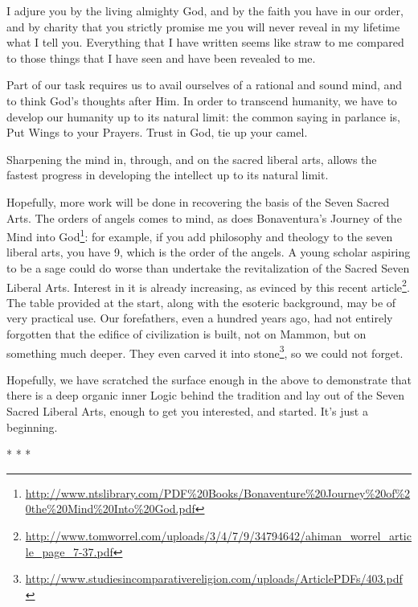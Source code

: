 \begin{quotex}
I adjure you by the living almighty God, and by the faith you have in our order, and by charity that you strictly promise me you will never reveal in my lifetime what I tell you. Everything that I have written seems like straw to me compared to those things that I have seen and have been revealed to me.
\end{quotex}


Part of our task requires us to avail ourselves of a rational and sound mind, and to think God's thoughts after Him. In order to transcend humanity, we have to develop our humanity up to its natural limit: the common saying in parlance is, Put Wings to your Prayers. Trust in God, tie up your camel.

Sharpening the mind in, through, and on the sacred liberal arts, allows the fastest progress in developing the intellect up to its natural limit.

Hopefully, more work will be done in recovering the basis of the Seven Sacred Arts. The orders of angels comes to mind, as does Bonaventura's Journey of the Mind into God\footnote{\url{http://www.ntslibrary.com/PDF\%20Books/Bonaventure\%20Journey\%20of\%20the\%20Mind\%20Into\%20God.pdf}}: for example, if you add philosophy and theology to the seven liberal arts, you have 9, which is the order of the angels. A young scholar aspiring to be a sage could do worse than undertake the revitalization of the Sacred Seven Liberal Arts. Interest in it is already increasing, as evinced by this recent article\footnote{\url{http://www.tomworrel.com/uploads/3/4/7/9/34794642/ahiman_worrel_article_page_7-37.pdf}}. The table provided at the start, along with the esoteric background, may be of very practical use. Our forefathers, even a hundred years ago, had not entirely forgotten that the edifice of civilization is built, not on Mammon, but on something much deeper. They even carved it into stone\footnote{\url{http://www.studiesincomparativereligion.com/uploads/ArticlePDFs/403.pdf}}, so we could not forget.

Hopefully, we have scratched the surface enough in the above to demonstrate that there is a deep organic inner Logic behind the tradition and lay out of the Seven Sacred Liberal Arts, enough to get you interested, and started. It's just a beginning.



\begin{center}* * *\end{center}

